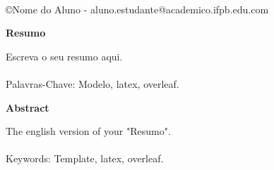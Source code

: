 \documentclass[12pt]{article}
\begin{document}
\par
\vfill
\begin{center}
{}\\
{{\normalsize \copyright Nome do Aluno -  aluno.estudante@academico.ifpb.edu.com}}
\end{center}




\thispagestyle{empty}
\newpage
\begin{center}
\textbf{\normalsize Resumo}
\end{center}
\vspace{1pt}
   
\noindent Escreva o seu resumo aqui.
\\  \\
Palavras-Chave: Modelo, latex, overleaf.

\thispagestyle{empty}

\newpage
\begin{center}
\textbf{\normalsize Abstract}
\end{center}
\vspace{1pt}

\noindent The english version of your "Resumo".
\\  \\
Keywords: Template, latex, overleaf.

\thispagestyle{empty}
\newpage
\listoffigures
\newpage
\listoftables
\newpage
\tableofcontents
\newpage

 
% 
% 
% 
% 
%

\newpage
\centering

 



\end{document}
